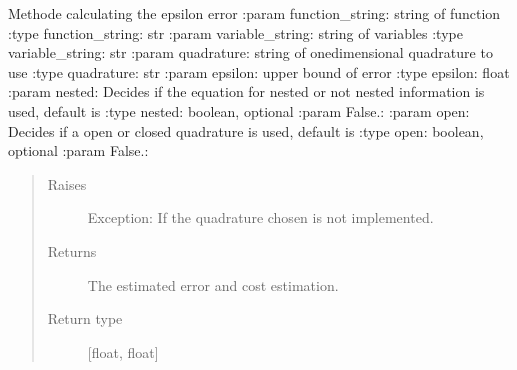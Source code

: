 \documentclass[letterpaper,10pt,english]{sphinxmanual}
\begin{document}
\begin{fulllineitems}
\label{\detokenize{index:Studienprojekt_Smolyak_qmc_one_point.epsilon_cost}}
Methode calculating the epsilon error
:param function\_string: string of function
:type function\_string: str
:param variable\_string: string of variables
:type variable\_string: str
:param quadrature: string of one\sphinxhyphen{}dimensional quadrature to use
:type quadrature: str
:param epsilon: upper bound of error
:type epsilon: float
:param nested: Decides if the equation for nested or not nested information is used, default is
:type nested: boolean, optional
:param False.:
:param open: Decides if a open or closed quadrature is used, default is
:type open: boolean, optional
:param False.:
\begin{quote}\begin{description}
\item[{Raises}] \leavevmode
{} \textendash{} Exception: If the quadrature chosen is not implemented.

\item[{Returns}] \leavevmode
The estimated error and cost estimation.

\item[{Return type}] \leavevmode
{[}float, float{]}

\end{description}\end{quote}

\end{fulllineitems}

\end{document}
